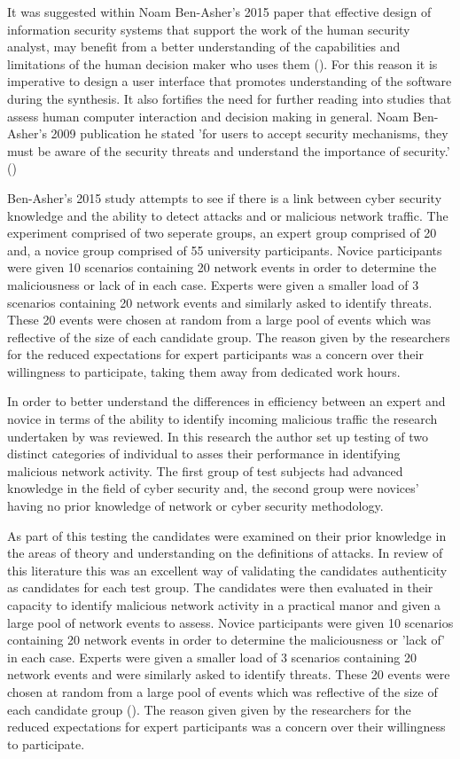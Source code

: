 It was suggested within Noam Ben-Asher's 2015 paper that effective design of information security systems that support the work of the human security analyst, may benefit from a better understanding of the capabilities and limitations of the human decision maker who uses them (\cite{ben2015effects}). For this reason it is imperative to design a user interface that promotes understanding of the software during the synthesis. It also fortifies the need for further reading into studies that assess human computer interaction and decision making in general. Noam Ben-Asher's 2009 publication he stated 'for users to accept security mechanisms, they must be aware of the security threats and understand the importance of security.' (\cite{ben2009experimental})

Ben-Asher's 2015 study attempts to see if there is a link between cyber security knowledge and the ability to detect attacks and or malicious network traffic. The experiment comprised of two seperate groups, an expert group comprised of 20 and, a novice group comprised of 55 university participants. Novice participants were given 10 scenarios containing 20 network events in order to determine the maliciousness or lack of in each case. Experts were given a smaller load of 3 scenarios containing 20 network events and similarly asked to identify threats. These 20 events were chosen at random from a large pool of events which was reflective of the size of each candidate group. The reason given by the researchers for the reduced expectations for expert participants was a concern over their willingness to participate, taking them away from dedicated work hours.   

In order to better understand the differences in efficiency between an expert and novice in terms of the ability to identify incoming malicious traffic the research undertaken by \citeauthor{ben2015effects} was reviewed. In this research the author set up testing of two distinct categories of individual to asses their performance in identifying malicious network activity. The first group of test subjects had advanced knowledge in the field of cyber security and, the second group were novices' having no prior knowledge of network or cyber security methodology. 

As part of this testing the candidates were examined on their prior knowledge in the areas of theory and understanding on the definitions of attacks. In review of this literature this was an excellent way of validating the candidates authenticity as candidates for each test group. The candidates were then evaluated in their capacity to identify malicious network activity in a practical manor and given a large pool of network events to assess. Novice participants were given 10 scenarios containing 20 network events in order to determine the maliciousness or 'lack of' in each case. Experts were given a smaller load of 3 scenarios containing 20 network events and were similarly asked to identify threats. These 20 events were chosen at random from a large pool of events which was reflective of the size of each candidate group (\cite{ben2015effects}). The reason given given by the researchers for the reduced expectations for expert participants was a concern over their willingness to participate.

